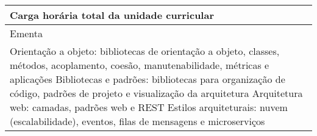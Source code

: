 \begin{quadro}[ht!]
\begin{tabular}{|p{3cm} p{2cm} p{3cm} p{2cm} p{3cm} p{2cm}|}
\multicolumn{5}{|p{13cm}|}{\cellcolor{blue1} Carga horária total da unidade curricular} & \multicolumn{1}{p{1cm}|}{\raggedleft 60	}\\\hline
\multicolumn{6}{|p{15cm}|}{\cellcolor{blue1} Ementa} \\\hline
\hline\multicolumn{6}{|p{15cm}|}{\scriptsize Orientação a objeto: bibliotecas de orientação a objeto, classes, métodos, acoplamento, coesão, manutenabilidade, métricas e aplicações Bibliotecas e padrões: bibliotecas para organização de código, padrões de projeto e visualização da arquitetura Arquitetura web: camadas, padrões web e REST Estilos arquiteturais: nuvem (escalabilidade), eventos, filas de mensagens e microserviços }\\\hline
\hline
	\end{tabular}
\end{quadro}
